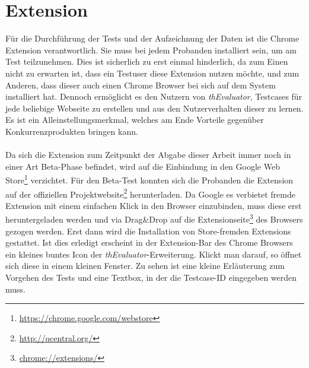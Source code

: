 %
%
%
%


\section{Extension}

Für die Durchführung der Tests und der Aufzeichnung der Daten ist die Chrome Extension verantwortlich. Sie muss bei jedem Probanden installiert sein, um am Test teilzunehmen. Dies ist sicherlich zu erst einmal hinderlich, da zum Einen nicht zu erwarten ist, dass ein Testuser diese Extension nutzen möchte, und zum Anderen, dass dieser auch einen Chrome Browser bei sich auf dem System installiert hat. Dennoch ermöglicht es den Nutzern von \textit{thEvaluator}, Testcases für jede beliebige Webseite zu erstellen und aus den Nutzerverhalten dieser zu lernen. Es ist ein Alleinstellungsmerkmal, welches am Ende Vorteile gegenüber Konkurrenzprodukten bringen kann.\\
\\
Da sich die Extension zum Zeitpunkt der Abgabe dieser Arbeit immer noch in einer Art Beta-Phase befindet, wird auf die Einbindung in den Google Web Store\footnote{\url{https://chrome.google.com/webstore}} verzichtet. Für den Beta-Test konnten sich die Probanden die Extension auf der offiziellen Projektwebsite\footnote{\url{http://qcentral.org/}} herunterladen. Da Google es verbietet fremde Extension mit einem einfachen Klick in den Browser einzubinden, muss diese erst heruntergeladen werden und via Drag\&Drop auf die Extensionseite\footnote{\url{chrome://extensions/}} des Browsers gezogen werden. Erst dann wird die Installation von Store-fremden Extensions gestattet. Ist dies erledigt erscheint in der Extension-Bar des Chrome Browsers ein kleines buntes Icon der \textit{thEvaluator}-Erweiterung. Klickt man darauf, so öffnet sich diese in einem kleinen Fenster. Zu sehen ist eine kleine Erläuterung zum Vorgehen des Tests und eine Textbox, in der die Testcase-ID eingegeben werden muss.

